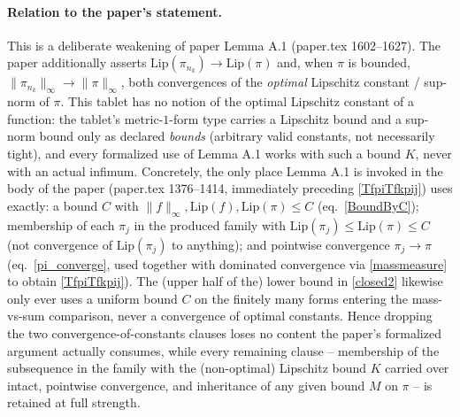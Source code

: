\begin{lemma}
  \paragraph{Relation to the paper's statement.} This is a deliberate weakening of paper Lemma A.1
  (paper.tex 1602--1627). The paper additionally asserts $\mathrm{Lip}(\pi_{n_k}) \to \mathrm{Lip}(\pi)$
  and, when $\pi$ is bounded, $\|\pi_{n_k}\|_\infty \to \|\pi\|_\infty$, both convergences of the
  \emph{optimal} Lipschitz constant / sup-norm of $\pi$. This tablet has no notion of the optimal
  Lipschitz constant of a function: the tablet's metric-$1$-form type carries a Lipschitz bound and
  a sup-norm bound only as declared \emph{bounds} (arbitrary valid constants, not necessarily
  tight), and every formalized use of Lemma A.1 works with such a bound $K$, never with an actual
  infimum. Concretely, the only place Lemma A.1 is invoked in the body of the paper (paper.tex
  1376--1414, immediately preceding \eqref{TfpiTfkpij}) uses exactly: a bound $C$ with $\|f\|_\infty,
  \mathrm{Lip}(f), \mathrm{Lip}(\pi) \le C$ (eq.~\eqref{BoundByC}); membership of each $\pi_j$ in
  the produced family with $\mathrm{Lip}(\pi_j) \le \mathrm{Lip}(\pi) \le C$ (not convergence of
  $\mathrm{Lip}(\pi_j)$ to anything); and pointwise convergence $\pi_j \to \pi$
  (eq.~\eqref{pi_converge}, used together with dominated convergence via \eqref{massmeasure} to
  obtain \eqref{TfpiTfkpij}). The (upper half of the) lower bound in \eqref{closed2} likewise only
  ever uses a uniform bound $C$ on the finitely many forms entering the mass-vs-sum comparison,
  never a convergence of optimal constants. Hence dropping the two convergence-of-constants clauses
  loses no content the paper's formalized argument actually consumes, while every remaining clause
  -- membership of the subsequence in the family with the (non-optimal) Lipschitz bound $K$ carried
  over intact, pointwise convergence, and inheritance of any given bound $M$ on $\pi$ -- is
  retained at full strength.
\end{lemma}
